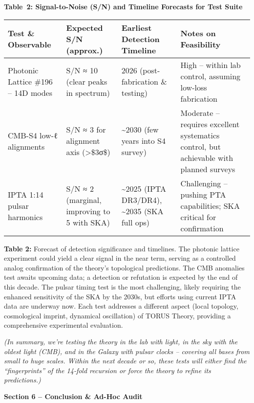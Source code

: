 \documentclass[]{article}
\begin{document}
\textbf{Table~2: Signal-to-Noise (S/N) and Timeline Forecasts for Test
Suite}

\begin{longtable}[]{@{}llll@{}}
\toprule
\textbf{Test \& Observable} & \textbf{Expected S/N (approx.)} &
\textbf{Earliest Detection Timeline} & \textbf{Notes on
Feasibility}\tabularnewline
\midrule
\endhead
Photonic Lattice \#196 -- 14D modes & S/N ≈ 10 (clear peaks in
spectrum)​ & 2026 (post-fabrication \& testing) & High -- within lab
control, assuming low-loss fabrication\tabularnewline
CMB-S4 low-ℓ alignments & S/N ≈ 3 for alignment axis
(\textgreater{}\$3σ\$)​ & \textasciitilde{}2030 (few years into S4
survey) & Moderate -- requires excellent systematics control, but
achievable with planned surveys\tabularnewline
IPTA 1:14 pulsar harmonics & S/N ≈ 2 (marginal, improving to 5 with
SKA)​ & \textasciitilde{}2025 (IPTA DR3/DR4), \textasciitilde{}2035 (SKA
full ops) & Challenging -- pushing PTA capabilities; SKA critical for
confirmation\tabularnewline
\bottomrule
\end{longtable}

\textbf{Table 2:} Forecast of detection significance and timelines. The
photonic lattice experiment could yield a clear signal in the near term,
serving as a controlled analog confirmation of the theory's topological
predictions. The CMB anomalies test awaits upcoming data; a detection or
refutation is expected by the end of this decade. The pulsar timing test
is the most challenging, likely requiring the enhanced sensitivity of
the SKA by the 2030s, but efforts using current IPTA data are underway
now. Each test addresses a different aspect (local topology,
cosmological imprint, dynamical oscillation) of TORUS Theory, providing
a comprehensive experimental evaluation.

\emph{(In summary, we're testing the theory in the lab with light, in
the sky with the oldest light (CMB), and in the Galaxy with pulsar
clocks -- covering all bases from small to huge scales. Within the next
decade or so, these tests will either find the ``fingerprints'' of the
14-fold recursion or force the theory to refine its predictions.)}

\textbf{Section 6 -- Conclusion \& Ad-Hoc Audit}
\end{document}
